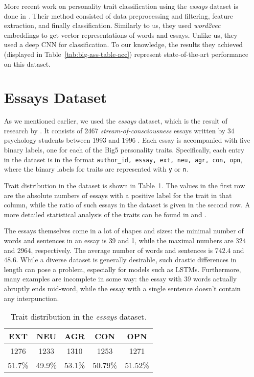 \documentclass[10pt, a4paper]{article}
\begin{document}
More recent work on personality trait classification using the \textit{essays} dataset is done in \citep{majumder}. Their method consisted of data preprocessing and filtering, feature extraction, and finally classification. Similarly to us, they used \textit{word2vec} embeddings to get vector representations of words and essays. Unlike us, they used a deep CNN for classification. To our knowledge, the results they achieved (displayed in Table~\ref{tab:big-ass-table-acc}) represent state-of-the-art performance on this dataset.


\section{Essays Dataset}
\label{sec-dataset}
As we mentioned earlier, we used the \textit{essays} dataset, which is the result of research by \citet{essays}. It consists of 2467 \textit{stream-of-consciousness} essays written by 34 psychology students between 1993 and 1996 \citep{tighe-2016}. Each essay is accompanied with five binary labels, one for each of the Big5 personality traits. Specifically, each entry in the dataset is in the format \texttt{author\_id, essay, ext, neu, agr, con, opn}, where the binary labels for traits are represented with \texttt{y} or \texttt{n}.

Trait distribution in the dataset is shown in Table~\ref{tab:label-distros}. The values in the first row are the absolute numbers of essays with a positive label for the trait in that column, while the ratio of such essays in the dataset is given in the second row. A more detailed statistical analysis of the traits can be found in \citep{essays} and \citep{ma2020}.

The essays themselves come in a lot of shapes and sizes: the minimal number of words and sentences in an essay is 39 and 1, while the maximal numbers are 324 and 2964, respectively. The average number of words and sentences is 742.4 and 48.6. While a diverse dataset is generally desirable, such drastic differences in length can pose a problem, especially for models such as LSTMs. Furthermore, many examples are incomplete in some way: the essay with 39 words actually abruptly ends mid-word, while the essay with a single sentence doesn't contain any interpunction.

\begin{table}
\caption{Trait distribution in the \textit{essays} dataset.}
\label{tab:label-distros}
\begin{center}
\begin{tabular}{ccccc}
\toprule
EXT & NEU & AGR & CON & OPN \\ 
\midrule
1276 & 1233 & 1310 & 1253 & 1271 \\
51.7\% & 49.9\% & 53.1\% & 50.79\% & 51.52\% \\
\bottomrule
\end{tabular}
\end{center}
\end{table}
\end{document}
